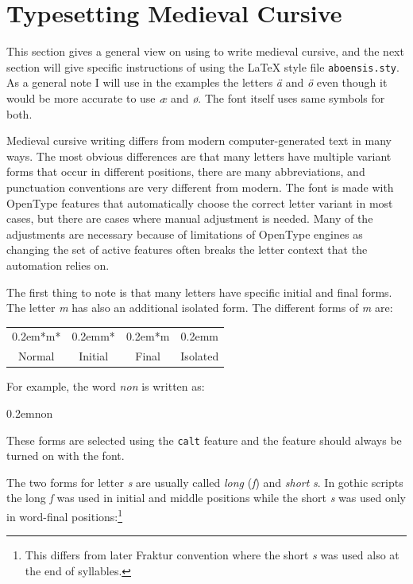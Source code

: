 \documentclass[a4paper]{article}
\newcommand{\package}[1]{\texttt{#1}}
\newcommand{\samplefont}{\fontsize{16}{16}\abcursivefamily\spaceskip0.2em}
\newcommand{\sample}[1]{{\samplefont #1 \strut}}
\begin{document}
\section{Typesetting Medieval Cursive}

This section gives a general view on using \Aboensis{} to write
medieval cursive, and the next section will give specific instructions
of using the LaTeX style file \package{aboensis.sty}. As a general
note I will use in the examples the letters \emph{ä} and \emph{ö} even
though it would be more accurate to use \emph{æ} and \emph{ø}. The
font itself uses same symbols for both.

Medieval cursive writing differs from modern computer-generated text
in many ways. The most obvious differences are that many letters have
multiple variant forms that occur in different positions, there are
many abbreviations, and punctuation conventions are very different
from modern. The \Aboensis{} font is made with OpenType features that
automatically choose the correct letter variant in most cases, but
there are cases where manual adjustment is needed. Many of the
adjustments are necessary because of limitations of OpenType engines
as changing the set of active features often breaks the letter context
that the automation relies on.

The first thing to note is that many letters have specific initial and
final forms. The letter \emph{m} has also an additional isolated form.
The different forms of \emph{m} are:

\begin{center}
  \begin{tabular}{cccc}
    \sample{*m*} & \sample{m*} & \sample{*m} & \sample{m}
    \\ 
    Normal & Initial & Final & Isolated \\
  \end{tabular}
\end{center}

For example, the word \emph{non} is written as:
\begin{center}
  \sample{non}
\end{center}

These forms are selected using the \texttt{calt} feature and the
feature should always be turned on with the font.

The two forms for letter \emph{s} are usually called \emph{long}
(\emph{ſ}) and \emph{short} \emph{s}. In gothic scripts the long
\emph{ſ} was used in initial and middle positions while the short
\emph{s} was used only in word-final positions:\footnote{This differs
  from later Fraktur convention where the short \emph{s} was used also
  at the end of syllables.}
\end{document}
